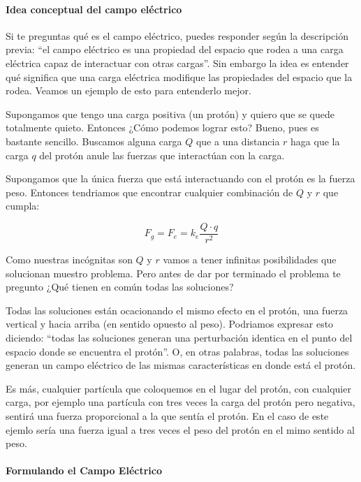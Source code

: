 \paragraph{Idea conceptual del campo eléctrico}

Si te preguntas qué es el campo eléctrico, puedes responder según la descripción previa: ``el campo eléctrico es una propiedad del espacio que rodea a una carga eléctrica capaz de interactuar con otras cargas''. Sin embargo la idea es entender qué significa que una carga eléctrica modifique las propiedades del espacio que la rodea. Veamos un ejemplo de esto para entenderlo mejor.

Supongamos que tengo una carga positiva (un protón) y quiero que se quede totalmente quieto. Entonces ¿Cómo podemos lograr esto? 
Bueno, pues es bastante sencillo. Buscamos alguna carga \( Q \) que a una distancia \( r \) haga que la carga \( q \) del protón anule las fuerzas que interactúan con la carga.

Supongamos que la única fuerza que está interactuando con el protón es la fuerza peso. Entonces tendriamos que encontrar cualquier combinación de \( Q \) y \( r \) que cumpla:

\[
    F_g = F_e = k_e \frac{Q \cdot q}{r^2}
\]

Como nuestras incógnitas son \( Q \) y \( r \) vamos a tener infinitas posibilidades que solucionan muestro problema. Pero antes de dar por terminado el problema te pregunto ¿Qué tienen en común todas las soluciones?

Todas las soluciones están ocacionando el mismo efecto en el protón, una fuerza vertical y hacia arriba (en sentido opuesto al peso). Podriamos expresar esto diciendo: ``todas las soluciones generan una perturbación identica en el punto del espacio donde se encuentra el protón''. O, en otras palabras, todas las soluciones generan un campo eléctrico de las mismas características en donde está el protón.

Es más, cualquier partícula que coloquemos en el lugar del protón, con cualquier carga, por ejemplo una partícula con tres veces la carga del protón pero negativa, sentirá una fuerza proporcional a la que sentía el protón. En el caso de este ejemlo sería una fuerza igual a tres veces el peso del protón en el mimo sentido al peso.

\paragraph{Formulando el Campo Eléctrico}

